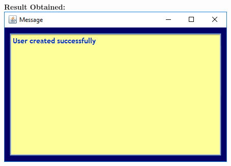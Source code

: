 \documentclass{article}
\begin{document}
\begin{enumerate}
\begin{itemize}
\begin{itemize}
\\
\textbf{Result Obtained:}\\
\includegraphics[scale=0.8]{images/LibrarianLogin/Actions/CreateUser/SuccessfullyCreated.PNG}
\\

\end{itemize}



\end{itemize}
\end{enumerate}
\end{document}
